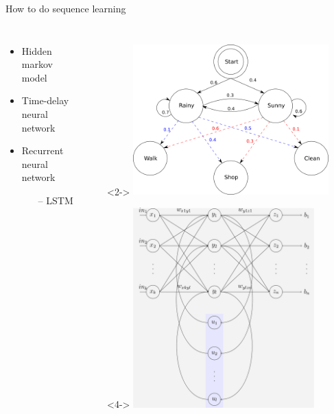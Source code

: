 \documentclass[11pt,center]{beamer}
\begin{document}
\begin{frame}{How to do sequence learning}
  \begin{columns}
    \begin{itemize}
      \item<2-> Hidden markov model
      \item<3-> Time-delay neural network
      \item<4-> Recurrent neural network
        \begin{itemize}
          \item[--] LSTM
        \end{itemize}
    \end{itemize}
    \begin{itemize}
      \item[]<2-> \includegraphics[width=0.8\textwidth]{../pics/hmm2}
      \item[]<4-> \includegraphics[width=0.74\textwidth]{../pics/rnn}
    \end{itemize}
  \end{columns}
\end{frame}
\end{document}
